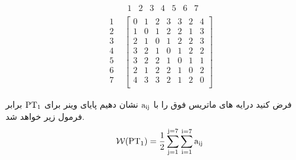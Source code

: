 \documentclass[Persian]{cacna2023-fa}
\begin{document}
				  \[
\begin{array}{cc} 
&
\begin{array}{ccccccc} 
1 & 2 & 3 & 4 & 5 & 6 & 7
\end{array}
\\
\begin{array}{c}
1 \\
2 \\
3 \\
4 \\
5 \\
6 \\
7 \\
\end{array}
&
\left[
\begin{array}{ccccccc}
						0 & 1 & 2 & 3 & 3 & 2 & 4 \\
						1 & 0 & 1 & 2 & 2 & 1 & 3 \\
						2 & 1 & 0 & 1 & 2 & 2 & 3 \\
						3 & 2 & 1 & 0 & 1 & 2 & 2 \\
						3 & 2 & 2 & 1 & 0 & 1 & 1 \\
						2 & 1 & 2 & 2 & 1 & 0 & 2 \\
						4 & 3 & 3 & 2 & 1 & 2 & 0 \\
\end{array}
\right]
\end{array}
\]


				فرض کنید درایه های ماتریس فوق را با ${\rm a_{ij}}$
				نشان دهیم پایای وینر برای ${\rm PT_1}$
			برابر فرمول زیر خواهد شد.
				\begin{equation}
					\mathcal{W}(\rm PT_1) = \frac{1}{2} \sum_{j=1}^{j=7}\sum_{i=1 }^{i=7}\rm a_{ij}
				\end{equation}
				\newline
\end{document}
